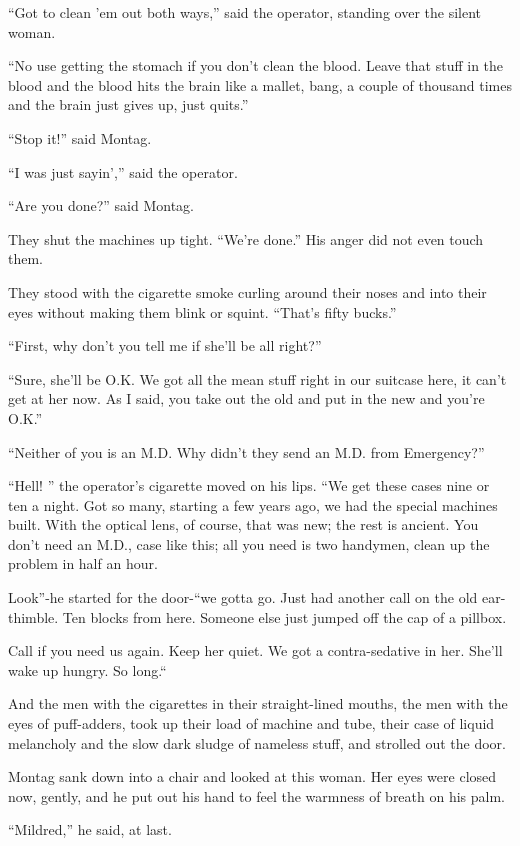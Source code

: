 \documentclass[11pt,openany]{book}
\begin{document}
``Got to clean 'em out both ways,'' said the operator, standing over the silent woman.

``No use getting the stomach if you don't clean the blood. Leave that stuff in the blood and the blood hits the brain like a mallet, bang, a couple of thousand times and the brain just gives up, just quits.''

``Stop it!'' said Montag.

``I was just sayin','' said the operator.

``Are you done?'' said Montag.

They shut the machines up tight. ``We're done.'' His anger did not even touch them.

They stood with the cigarette smoke curling around their noses and into their eyes without making them blink or squint. ``That's fifty bucks.''

``First, why don't you tell me if she'll be all right?''

``Sure, she'll be O.K. We got all the mean stuff right in our suitcase here, it can't get at her now. As I said, you take out the old and put in the new and you're O.K.''

``Neither of you is an M.D. Why didn't they send an M.D. from Emergency?''

``Hell! '' the operator's cigarette moved on his lips. ``We get these cases nine or ten a night. Got so many, starting a few years ago, we had the special machines built. With the optical lens, of course, that was new; the rest is ancient. You don't need an M.D., case like this; all you need is two handymen, clean up the problem in half an hour.

Look''-he started for the door-``we gotta go. Just had another call on the old ear-thimble. Ten blocks from here. Someone else just jumped off the cap of a pillbox.

Call if you need us again. Keep her quiet. We got a contra-sedative in her. She'll wake up hungry. So long.``

And the men with the cigarettes in their straight-lined mouths, the men with the eyes of puff-adders, took up their load of machine and tube, their case of liquid melancholy and the slow dark sludge of nameless stuff, and strolled out the door.

Montag sank down into a chair and looked at this woman. Her eyes were closed now, gently, and he put out his hand to feel the warmness of breath on his palm.

``Mildred,'' he said, at last.
\end{document}
